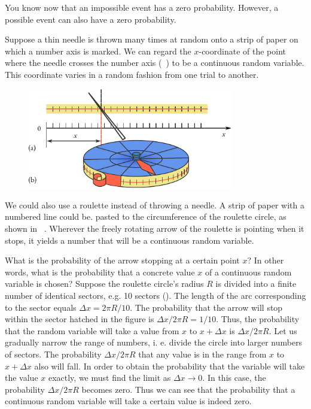 You know
now that an impossible event has a zero probability. However, a
possible event can also have a zero probability.

Suppose a thin needle is thrown many times at random onto a strip
of paper on which a number axis is marked. We can regard the
$x$-coordinate of the point where the needle crosses the number axis
(~) to be a continuous random variable. This coordinate varies in a random fashion from one trial to another.

\begin{figure}[!h]
 \centering
 \includegraphics[width=0.8\textwidth]{figures/needle.pdf}
 \end{figure}
We could also use a roulette instead of throwing a needle. A strip of
paper with a numbered line could be. pasted to the circumference of
the roulette circle, as shown in ~. Wherever the freely
rotating arrow of the roulette is pointing when it stops, it yields a
number that will be a continuous random variable.

What is the probability of the arrow stopping at a certain point $x$?
In other words, what is the probability that a concrete value $x$ of a
continuous random variable is chosen? Suppose the roulette
circle's radius $R$ is divided into a finite number of identical
sectors, e.g. 10 sectors (). The length of the
arc corresponding to the sector equals $\Delta x = 2 \pi R/10$. The
probability that the arrow will stop within the sector hatched in the
figure is $\Delta x / 2 \pi R = 1/10$. Thus, the probability that the
random variable will take a value from $x$ to $x + \Delta x$ is
$\Delta x / 2 \pi R $. Let us gradually narrow the range of numbers,
i. e. divide the circle into larger numbers of sectors. The
probability $\Delta x / 2 \pi R $ that any value is in the range from
$x$ to $x + \Delta x$ also will fall. In order to obtain the
probability that the variable will take the value $x$ exactly, we must
find the limit as $\Delta x \to 0 $. In this case, the probability
$\Delta x / 2 \pi R $ becomes zero.  Thus we can see that the
probability that a continuous random variable will take a certain
value is indeed zero.

